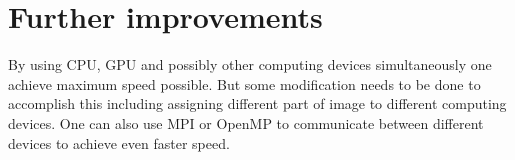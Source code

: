 \documentclass{article}
\begin{document}
  \section{Further improvements}

  By using CPU, GPU and possibly other computing devices simultaneously one achieve maximum speed possible. But some
  modification needs to be done to accomplish this including assigning different part of image to different computing
  devices. One can also use MPI or OpenMP to communicate between different devices to achieve even faster speed.
\end{document}
